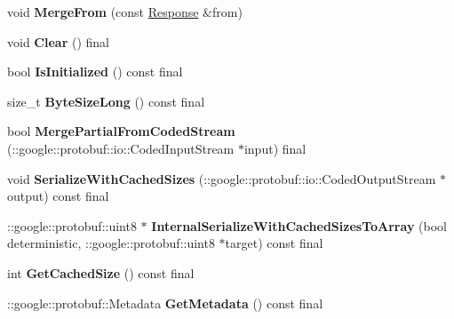 \begin{DoxyCompactItemize}
\item 
\mbox{\label{classcoappbrpc_1_1Response_a9e65ff105d739a4f0fda6cf8ea0dd91f}} 
void {\bfseries Merge\+From} (const \hyperlink{classcoappbrpc_1_1Response}{Response} \&from)
\item 
\mbox{\label{classcoappbrpc_1_1Response_aa9b68b199f18a06cf3036430e6469ec2}} 
void {\bfseries Clear} () final
\item 
\mbox{\label{classcoappbrpc_1_1Response_a687c386d4428e724be5226c2c2c14479}} 
bool {\bfseries Is\+Initialized} () const final
\item 
\mbox{\label{classcoappbrpc_1_1Response_a85bd1f7ae73c9dc3d370547a2794d56d}} 
size\+\_\+t {\bfseries Byte\+Size\+Long} () const final
\item 
\mbox{\label{classcoappbrpc_1_1Response_a338f6e91d6b68734fab073e37e842104}} 
bool {\bfseries Merge\+Partial\+From\+Coded\+Stream} (\+::google\+::protobuf\+::io\+::\+Coded\+Input\+Stream $\ast$input) final
\item 
\mbox{\label{classcoappbrpc_1_1Response_a9245b3575fed37198c288936a47ba31c}} 
void {\bfseries Serialize\+With\+Cached\+Sizes} (\+::google\+::protobuf\+::io\+::\+Coded\+Output\+Stream $\ast$output) const final
\item 
\mbox{\label{classcoappbrpc_1_1Response_a54352ac27422f88aec17253468593172}} 
\+::google\+::protobuf\+::uint8 $\ast$ {\bfseries Internal\+Serialize\+With\+Cached\+Sizes\+To\+Array} (bool deterministic, \+::google\+::protobuf\+::uint8 $\ast$target) const final
\item 
\mbox{\label{classcoappbrpc_1_1Response_a4eeebf1befe309f178185e3f8b4da3d1}} 
int {\bfseries Get\+Cached\+Size} () const final
\item 
\mbox{\label{classcoappbrpc_1_1Response_a6724cea13f3ebabd4db02fead5bf0b12}} 
\+::google\+::protobuf\+::\+Metadata {\bfseries Get\+Metadata} () const final
\item 

\end{DoxyCompactItemize}
